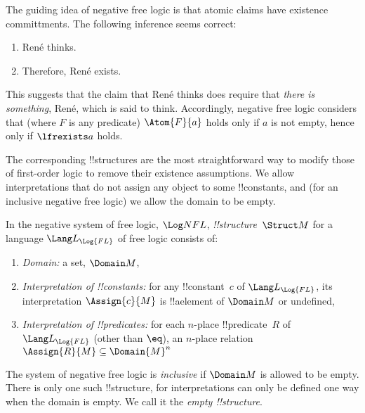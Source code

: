 \documentclass[../../../include/open-logic-section]{subfiles}
\begin{document}


The guiding idea of negative free logic is that atomic claims have
existence committments. The following inference seems correct:

\begin{enumerate}
  \item René thinks.
  \item Therefore, René exists.
\end{enumerate}

This suggests that the claim that René thinks does require that \emph{there is 
something}, René, which is said to think.  Accordingly, negative free logic 
considers that (where $F$ is any predicate) $\Atom{F}{a}$ holds only 
if $a$ is not empty, hence only if $\lfrexists a$ holds. 

\begin{explain}
The corresponding !!{structure}s are the most straightforward way to 
modify those of first-order logic to remove their existence assumptions.
We allow interpretations that do not assign any object to some !!{constant}s,
and (for an inclusive negative free logic) we allow the domain to be empty.
\end{explain}

\begin{defn}[!!^{structure}s]
In the negative system of free logic, $\Log NFL$,
 \emph{!!{structure}}~$\Struct M$ for a language
$\Lang L_{\Log{FL}}$ of free logic consists of:
\begin{enumerate}
\item \emph{Domain:} a set, $\Domain M$,
\item \emph{Interpretation of !!{constant}s:} for any !!{constant}~$c$ of
  $\Lang L_{\Log{FL}}$, its interpretation $\Assign{c}{M}$ is !!a{element} of 
  $\Domain M$ or undefined,
\item \emph{Interpretation of !!{predicate}s:} for each $n$-place
  !!{predicate}~$R$ of $\Lang L_{\Log{FL}}$ (other than $\eq$), an $n$-place
  relation $\Assign{R}{M} \subseteq \Domain{M}^n$
\end{enumerate}
The system of negative free logic is \emph{inclusive} if $\Domain M$ is
allowed to be empty. There is only one such !!{structure}, for interpretations
can only be defined one way when the domain is empty. We call it the 
\emph{empty !!{structure}}.
\end{defn}
\end{document}
